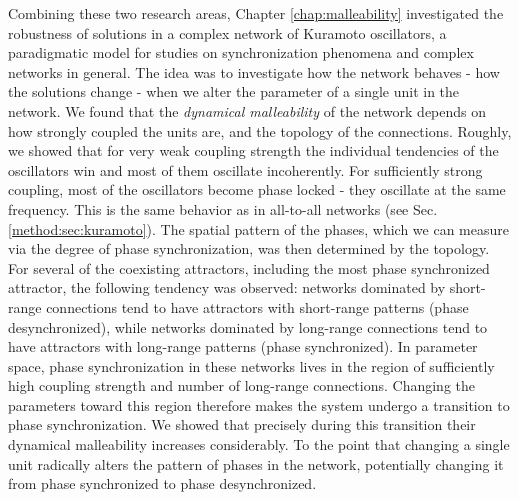Combining these two research areas, Chapter \ref{chap:malleability} investigated the robustness of solutions in a complex network of Kuramoto oscillators, a paradigmatic model for studies on synchronization phenomena and complex networks in general. The idea was to investigate how the network behaves - how the solutions change - when we alter the parameter of a single unit in the network. We found that the \textit{dynamical malleability} of the network depends on how strongly coupled the units are, and the topology of the connections. 
Roughly, we showed that for very weak coupling strength the individual tendencies of the oscillators win and most of them oscillate incoherently. For sufficiently strong coupling, most of the oscillators become phase locked - they oscillate at the same frequency. This is the same behavior as in all-to-all networks (see Sec.\ref{method:sec:kuramoto}). The spatial pattern of the phases, which we can measure via the degree of phase synchronization, was then determined by the topology. For several of the coexisting attractors, including the most phase synchronized attractor, the following tendency was observed: networks dominated by short-range connections tend to have attractors with short-range patterns (phase desynchronized), while networks dominated by long-range connections tend to have attractors with long-range patterns (phase synchronized). 
In parameter space, phase synchronization in these networks lives in the region of sufficiently high coupling strength and number of long-range connections. Changing the parameters toward this region therefore makes the system undergo a transition to phase synchronization. We showed that precisely during this transition their dynamical malleability increases considerably. To the point that changing a single unit radically alters the pattern of phases in the network, potentially changing it from phase synchronized to phase desynchronized. 

